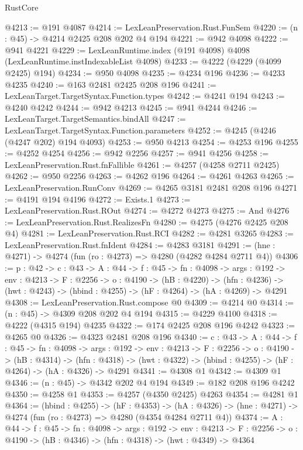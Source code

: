 \begin{lexlean}{RustCore}
\begin{coremodule}
@4213 := @191 @4087
@4214 := LexLeanPreservation.Rust.FunSem
@4220 := (n : @45) -> @4214 @2425 @208 @202 @4 @194
@4221 := @942 @4098
@4222 := @941 @4221
@4229 := LexLeanRuntime.index (@191 @4098) @4098 (LexLeanRuntime.instIndexableList @4098)
@4233 := @4222 (@4229 (@4099 @2425) @194)
@4234 := @950 @4098
@4235 := @4234 @196
@4236 := @4233 @4235
@4240 := @163 @2481 @2425 @208 @196
@4241 := LexLeanTarget.TargetSyntax.Function.types
@4242 := @4241 @194
@4243 := @4240 @4242
@4244 := @942 @4213
@4245 := @941 @4244
@4246 := LexLeanTarget.TargetSemantics.bindAll
@4247 := LexLeanTarget.TargetSyntax.Function.parameters
@4252 := @4245 (@4246 (@4247 @202) @194 @4093)
@4253 := @950 @4213
@4254 := @4253 @196
@4255 := @4252 @4254
@4256 := @942 @2256
@4257 := @941 @4256
@4258 := LexLeanPreservation.Rust.fnFallible
@4261 := @4257 (@4258 @2711 @2425)
@4262 := @950 @2256
@4263 := @4262 @196
@4264 := @4261 @4263
@4265 := LexLeanPreservation.RunConv
@4269 := @4265 @3181 @2481 @208 @196
@4271 := @4191 @194 @4196
@4272 := Exists.{1}
@4273 := LexLeanPreservation.Rust.ROut
@4274 := @4272 @4273
@4275 := And
@4276 := LexLeanPreservation.Rust.RealizesFn
@4280 := @4275 (@4276 @2425 @208 @4)
@4281 := LexLeanPreservation.Rust.RCI
@4282 := @4281 @3265
@4283 := LexLeanPreservation.Rust.fnIdent
@4284 := @4283 @3181
@4291 := (hne : @4271) -> @4274 (fun (ro : @4273) => @4280 (@4282 @4284 @2711 @4))
@4306 := {p : @42} ->
  {c : @43} ->
  {A : @44} ->
  {f : @45} ->
  {fn : @4098} ->
  {args : @192} ->
  {env : @4213} ->
  {F : @2256} ->
  {o : @4190} ->
  (hB : @4220) ->
  (hfn : @4236) -> (hwt : @4243) -> (hbind : @4255) -> (hF : @4264) -> (hA : @4269) -> @4291
@4308 := LexLeanPreservation.Rust.compose @0
@4309 := @4214 @0
@4314 := (n : @45) -> @4309 @208 @202 @4 @194
@4315 := @4229 @4100
@4318 := @4222 (@4315 @194) @4235
@4322 := @174 @2425 @208 @196 @4242
@4323 := @4265 @0
@4326 := @4323 @2481 @208 @196
@4340 := {c : @43} ->
  {A : @44} ->
  {f : @45} ->
  {fn : @4098} ->
  {args : @192} ->
  {env : @4213} ->
  {F : @2256} ->
  {o : @4190} ->
  (hB : @4314) ->
  (hfn : @4318) -> (hwt : @4322) -> (hbind : @4255) -> (hF : @4264) -> (hA : @4326) -> @4291
@4341 := @4308 @1
@4342 := @4309 @1
@4346 := (n : @45) -> @4342 @202 @4 @194
@4349 := @182 @208 @196 @4242
@4350 := @4258 @1
@4353 := @4257 (@4350 @2425) @4263
@4354 := @4281 @1
@4364 := (hbind : @4255) ->
  (hF : @4353) ->
  (hA : @4326) -> (hne : @4271) -> @4274 (fun (ro : @4273) => @4280 (@4354 @4284 @2711 @4))
@4374 := {A : @44} ->
  {f : @45} ->
  {fn : @4098} ->
  {args : @192} ->
  {env : @4213} ->
  {F : @2256} -> {o : @4190} -> (hB : @4346) -> (hfn : @4318) -> (hwt : @4349) -> @4364

\end{coremodule}
\end{lexlean}
